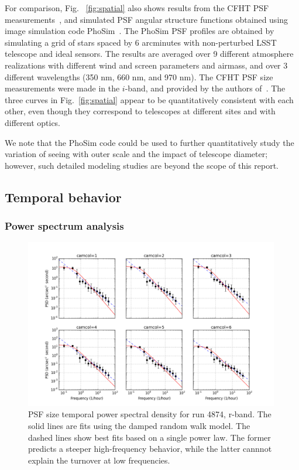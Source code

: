 For comparison, Fig. ~\ref{fig:spatial} also shows results from the CFHT PSF 
measurements~\citep{heymans2012}, and simulated PSF angular
structure functions obtained using image simulation code PhoSim~\citep{phosim}. 
The PhoSim PSF profiles are obtained by simulating a grid of stars
spaced by 6 arcminutes with non-perturbed LSST telescope and ideal sensors.
The results are averaged over 9 different atmosphere realizations with
different wind and screen parameters and airmass, and over 3 different
wavelengths (350 nm, 660 nm, and 970 nm).
The CFHT PSF size measurements were made in the $i$-band, and provided
by the authors of~\cite{heymans2012}.
The three curves in Fig.~\ref{fig:spatial} appear to be quantitatively
consistent with each other, even though they correspond to telescopes at
different sites and with different optics. 

We note that the PhoSim code could be used to further quantitatively study the variation
of seeing with outer scale and the impact of telescope diameter; however,
such detailed modeling studies are beyond the scope of this report. 


\subsection{Temporal behavior}

\subsubsection{Power spectrum analysis} 

\begin{figure}[th]
\centering
\includegraphics[width=0.99\textwidth]{FIGURES/temporalPSD.png}
\vskip -0.2in
\caption{PSF size temporal power spectral density for run 4874, r-band. 
The solid lines are fits using the damped random walk model. 
The dashed lines show best fits based on a single power law. The former
predicts a steeper high-frequency behavior, while the latter cannnot 
explain the turnover at low frequencies. 
\label{fig:psd}}
\end{figure}

